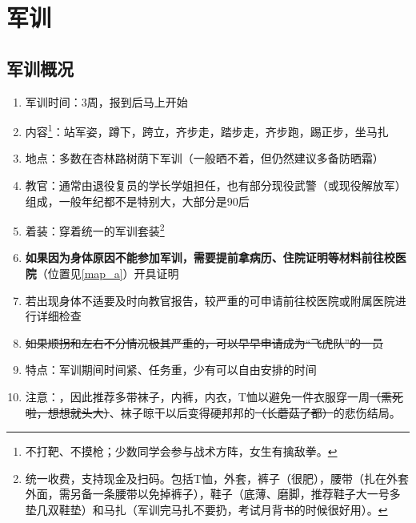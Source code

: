 \chapter[军训]{军训\vspace{-2em}}
\section[军训概况]{军训概况}
\begin{enumerate}
    \item 军训时间：3周，报到后马上开始
    \item 内容\footnote{不打靶、不摸枪；少数同学会参与战术方阵，女生有擒敌拳。}：站军姿，蹲下，跨立，齐步走，踏步走，齐步跑，踢正步，坐马扎
    \item 地点：多数在杏林路树荫下军训（一般晒不着，但仍然建议多备防晒霜）
    \item 教官：通常由退役复员的学长学姐担任，也有部分现役武警（或现役解放军）组成，一般年纪都不是特别大，大部分是90后
    \item 着装：穿着统一的军训套装\footnote{统一收费，支持现金及扫码。包括T恤，外套，裤子（很肥），腰带（扎在外套外面，需另备一条腰带以免掉裤子），鞋子（底薄、磨脚，推荐鞋子大一号多垫几双鞋垫）和马扎（军训完马扎不要扔，考试月背书的时候很好用）。}
    \item \textbf{如果因为身体原因不能参加军训，需要提前拿病历、住院证明等材料前往校医院}（位置见\uline{\ref{map_a}}）开具证明\label{exercise_unattend}
    \item 若出现身体不适要及时向教官报告，较严重的可申请前往校医院或附属医院进行详细检查
    \item \sout{如果顺拐和左右不分情况极其严重的，可以早早申请成为“飞虎队”\footnotemark 的一员}
    \item 特点：军训期间时间紧、任务重，少有可以自由安排的时间
    \item 注意：，因此推荐多带袜子，内裤，内衣，T恤以避免一件衣服穿一周\sout{（熏死\\啦，想想就头大）}、袜子晾干以后变得硬邦邦的\sout{（长蘑菇了都）}的悲伤结局。
\end{enumerate}
\vspace{-1.5em}
